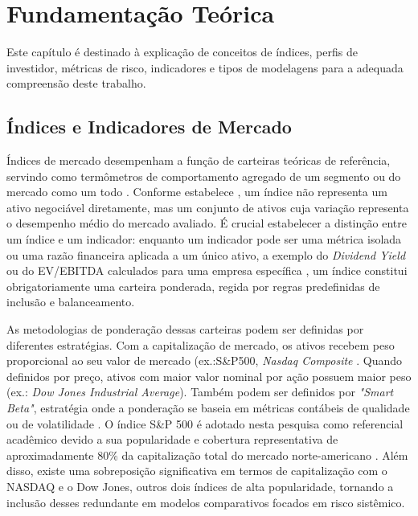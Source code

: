 \chapter{Fundamentação Teórica}
\label{fundamentacao}

Este capítulo é destinado à explicação de conceitos de índices, perfis de investidor, métricas de risco, indicadores e tipos de modelagens para a adequada compreensão deste trabalho.

\section{Índices e Indicadores de Mercado}

Índices de mercado desempenham a função de carteiras teóricas de referência, servindo como termômetros de comportamento agregado de um segmento ou do mercado como um todo \cite{Alekseev2016Benchmark-based}. Conforme estabelece , um índice não representa um ativo negociável diretamente, mas um conjunto de ativos cuja variação representa o desempenho médio do mercado avaliado. É crucial estabelecer a distinção entre um índice e um indicador: enquanto um indicador pode ser uma métrica isolada ou uma razão financeira aplicada a um único ativo, a exemplo do \textit{Dividend Yield} ou do EV/EBITDA calculados para uma empresa específica \cite{Wu2022An}, um índice constitui obrigatoriamente uma carteira ponderada, regida por regras predefinidas de inclusão e balanceamento. 

As metodologias de ponderação dessas carteiras podem ser definidas por diferentes estratégias. Com a capitalização de mercado, os ativos recebem peso proporcional ao seu valor de mercado (ex.:S\&P500, \textit{Nasdaq Composite} \cite{Indices2018TREND:}. Quando definidos por preço, ativos com maior valor nominal por ação possuem maior peso (ex.: \textit{Dow Jones Industrial Average}). Também podem ser definidos por \textit{"Smart Beta"}, estratégia onde a ponderação se baseia em métricas contábeis de qualidade ou de volatilidade \cite{Amenc2013Smart}. O índice S\&P 500 é adotado nesta pesquisa como referencial acadêmico devido a sua popularidade e cobertura representativa de aproximadamente 80\% da capitalização total do mercado norte-americano \cite{Asem2012The}. Além disso, existe uma sobreposição significativa em termos de capitalização com o NASDAQ e o Dow Jones, outros dois índices de alta popularidade, tornando a inclusão desses redundante em modelos comparativos focados em risco sistêmico.


